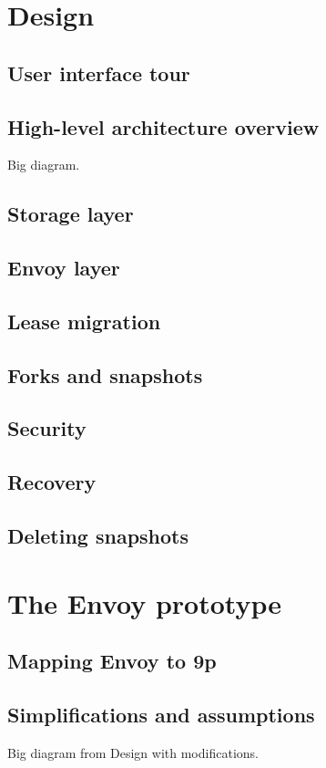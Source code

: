 \documentclass[a4paper]{article}
\begin{document}
\section{Design}

\subsection{User interface tour}
\subsection{High-level architecture overview}
Big diagram.
\subsection{Storage layer}
\subsection{Envoy layer}
\subsection{Lease migration}
\subsection{Forks and snapshots}
\subsection{Security}
\subsection{Recovery}
\subsection{Deleting snapshots}

\section{The Envoy prototype}

\subsection{Mapping Envoy to 9p}
\subsection{Simplifications and assumptions}
Big diagram from Design with modifications.
\end{document}
